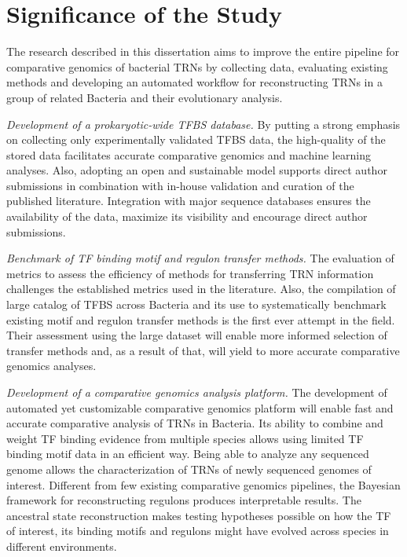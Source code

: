 \section{Significance of the Study}

The research described in this dissertation aims to improve the entire pipeline
for comparative genomics of bacterial TRNs by collecting data, evaluating
existing methods and developing an automated workflow for reconstructing TRNs
in a group of related Bacteria and their evolutionary analysis.

\textit{Development of a prokaryotic-wide TFBS database.}  By putting a strong
emphasis on collecting only experimentally validated TFBS data, the
high-quality of the stored data facilitates accurate comparative genomics and
machine learning analyses. Also, adopting an open and sustainable model
supports direct author submissions in combination with in-house validation and
curation of the published literature. Integration with major sequence databases
ensures the availability of the data, maximize its visibility and encourage
direct author submissions.

\textit{Benchmark of TF binding motif and regulon transfer methods.} The
evaluation of metrics to assess the efficiency of methods for transferring TRN
information challenges the established metrics used in the literature. Also,
the compilation of large catalog of TFBS across Bacteria and its use to
systematically benchmark existing motif and regulon transfer methods is the
first ever attempt in the field. Their assessment using the large dataset will
enable more informed selection of transfer methods and, as a result of that,
will yield to more accurate comparative genomics analyses.

\textit{Development of a comparative genomics analysis platform.} The
development of automated yet customizable comparative genomics platform will
enable fast and accurate comparative analysis of TRNs in Bacteria. Its ability
to combine and weight TF binding evidence from multiple species allows using
limited TF binding motif data in an efficient way. Being able to analyze any
sequenced genome allows the characterization of TRNs of newly sequenced genomes
of interest. Different from few existing comparative genomics pipelines, the
Bayesian framework for reconstructing regulons produces interpretable
results. The ancestral state reconstruction makes testing hypotheses possible
on how the TF of interest, its binding motifs and regulons might have evolved
across species in different environments.

